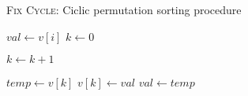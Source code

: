 \begin{algorithm}
\caption{\textsc{Fix Cycle}: Ciclic permutation sorting procedure}
\label{alg:fix_cycle}      
\begin{algorithmic}[1]
    \State $val \gets v[i]$
	\Do
		\State $k \leftarrow 0$
		
				\State $k \leftarrow k + 1$
			\EndIf
		\EndFor
		
		\State $temp \leftarrow v[k]$
		\State $v[k] \leftarrow val$
		\State $val \gets temp$
\EndProcedure
\end{algorithmic}
\end{algorithm}